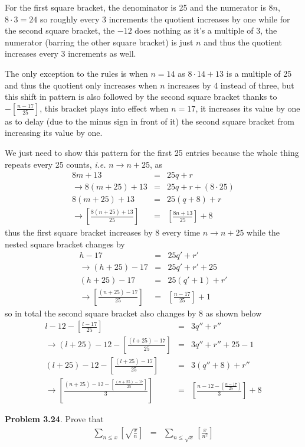 \documentclass[aps,preprint,preprintnumbers,nofootinbib,showpacs,prd]{revtex4-1}
\newcommand{\ie}{{\it i.e.} }
\newcommand{\nbea}{\begin{eqnarray*}}
\newcommand{\neea}{\end{eqnarray*}}
\begin{document}
For the first square bracket, the denominator is 25 and the numerator is $8n$, $8\cdot3=24$ so roughly every 3 increments the quotient increases by one while for the second square bracket, the $-12$ does nothing as it's a multiple of 3, the numerator (barring the other square bracket) is just $n$ and thus the quotient increases every 3 increments as well.

The only exception to the rules is when $n=14$ as $8\cdot14+13$ is a multiple of 25 and thus the quotient only increases when $n$ increases by 4 instead of three, but this shift in pattern is also followed by the second square bracket thanks to $-\left \lbrack \frac{n-17}{25} \right \rbrack$, this bracket plays into effect when $n=17$, it increases its value by one as to delay (due to the minus sign in front of it) the second square bracket from increasing its value by one.

We just need to show this pattern for the first 25 entries because the whole thing repeats every 25 counts, \ie $n \to n+25$, as
%
\nbea
8m + 13 & = & 25q + r \\
\to 8(m+25) + 13 & = & 25q + r + (8\cdot 25) \\
8(m+25) + 13 & = & 25(q + 8) + r \\
\to \left \lbrack \frac{8(n+25)+13}{25} \right \rbrack & = & \left \lbrack \frac{8n+13}{25} \right \rbrack + 8
\neea
%
thus the first square bracket increases by 8 every time $n \to n+25$ while the nested square bracket changes by
%
\nbea
h -17 & = & 25q' + r' \\
\to (h+25) - 17 & = & 25q' + r' + 25 \\
(h+25) - 17 & = & 25(q' + 1) + r' \\
\to \left \lbrack \frac{(n+25)-17}{25} \right \rbrack & = & \left \lbrack \frac{n-17}{25} \right \rbrack + 1
\neea
%
so in total the second square bracket also changes by 8 as shown below
%
\nbea
l - 12 - \left \lbrack \frac{l-17}{25} \right \rbrack & = & 3q'' + r'' \\
\to (l+25) - 12 - \left \lbrack \frac{(l+25)-17}{25} \right \rbrack & = & 3q'' + r'' + 25 - 1\\
(l+25) - 12 - \left \lbrack \frac{(l+25)-17}{25} \right \rbrack  & = & 3(q'' + 8) + r'' \\
\to \left \lbrack \frac{(n+25) - 12 - \left \lbrack \frac{(n+25)-17}{25} \right \rbrack}{3} \right \rbrack  & = & \left \lbrack \frac{n - 12 - \left \lbrack \frac{n-17}{25} \right \rbrack}{3}\right \rbrack + 8
\neea
%

{\bf Problem 3.24}. Prove that
%
\nbea
\sum_{n \le x} \left \lbrack \sqrt{\frac{x}{n}} \right \rbrack & = & \sum_{n \le \sqrt{x}} \left \lbrack \frac{x}{n^2} \right \rbrack
\neea
%
\end{document}
